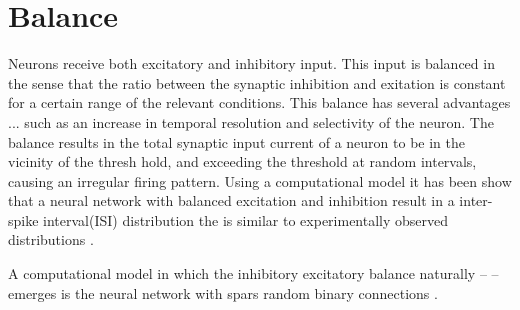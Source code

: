 \section{Balance}
Neurons receive both excitatory and inhibitory input. This input is balanced in the sense that the ratio between the synaptic inhibition and exitation is constant  for a certain range of the relevant conditions\cite{haider2006neocortical, shu2003turning, okun2008instantaneous, xue2014equalizing}.
This balance has several advantages ... such as an increase in temporal resolution \cite{wehr2003balanced} and selectivity of the neuron.
The balance results in the total synaptic input  current of a neuron to be in the vicinity of the thresh hold, and exceeding the threshold at random intervals, causing an irregular firing pattern.
Using a computational model it has been show that a neural network with balanced excitation and inhibition result in a inter-spike interval(ISI) distribution the is similar to experimentally observed distributions \cite{shadlen1998variable, shadlen1994noise}.

A computational model in which the inhibitory excitatory balance naturally -- -- emerges is the neural network with spars random binary connections \cite{vreeswijk1996chaos, vreeswijk1998chaotic}.




